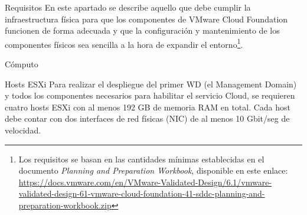 \begin{section}{Requisitos}
En este apartado se describe aquello que debe cumplir la infraestructura física para que los componentes de VMware Cloud Foundation funcionen de forma adecuada y que la configuración y mantenimiento de los componentes físicos sea sencilla a la hora de expandir el entorno\footnote{Los requisitos se basan en las cantidades mínimas establecidas en el documento \textit{Planning and Preparation Workbook}, disponible en este enlace: \url{https://docs.vmware.com/en/VMware-Validated-Design/6.1/vmware-validated-design-61-vmware-cloud-foundation-41-sddc-planning-and-preparation-workbook.zip}}.
\begin{subsection}{Cómputo}
\begin{subsubsection}{Hosts ESXi}
    Para realizar el despliegue del primer WD (el Management Domain) y todos los componentes necesarios para habilitar el servicio Cloud, se requieren cuatro hosts ESXi con al menos 192 GB de memoria RAM en total. Cada host debe contar con dos interfaces de red físicas (NIC) de al menos 10 Gbit/seg de velocidad. 
    

\end{subsubsection}
\end{subsection}
\end{section}
